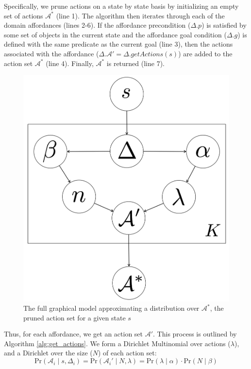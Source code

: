 \documentclass[conference]{IEEEtran}
\begin{document}
Specifically, we prune actions on a state by state basis
by initializing an empty set of actions $\mathcal{A}^*$ (line 1). The algorithm then iterates
through each of the domain affordances (lines 2-6). If the affordance
precondition ($\Delta.p$) is satisfied by some set of objects in the current state
and the affordance goal condition ($\Delta.g$) is defined with the same predicate
as the current goal (line 3), then the actions associated with the affordance ($\Delta.\mathcal{A}' = \Delta.getActions(s)$) are added to the action set $\mathcal{A}^*$ (line 4). Finally, $\mathcal{A}^*$ is returned (line 7).

\begin{figure}
\centering
\includegraphics[scale=0.15]{figures/learn_graphical_model.png}%
  \caption{The full graphical model approximating a distribution over $\mathcal{A}^*$, the pruned action set for a given state $s$}
  \label{fig:graphical_model}
\end{figure}

Thus, for each affordance, we get an action set $\mathcal{A}'$. This 
process is outlined by Algorithm \ref{alg:get_actions}. We form a Dirichlet Multinomial
over actions ($\lambda$), and a Dirichlet over the size ($N$) of each action set:
\begin{equation}
\text{Pr}(\mathcal{A}_i \mid s,\Delta_i) = \text{Pr}(\mathcal{A}_i' \mid N, \lambda) = \text{Pr}(\lambda \mid \alpha) \cdot \text{Pr}(N \mid \beta)
\end{equation}
\end{document}
